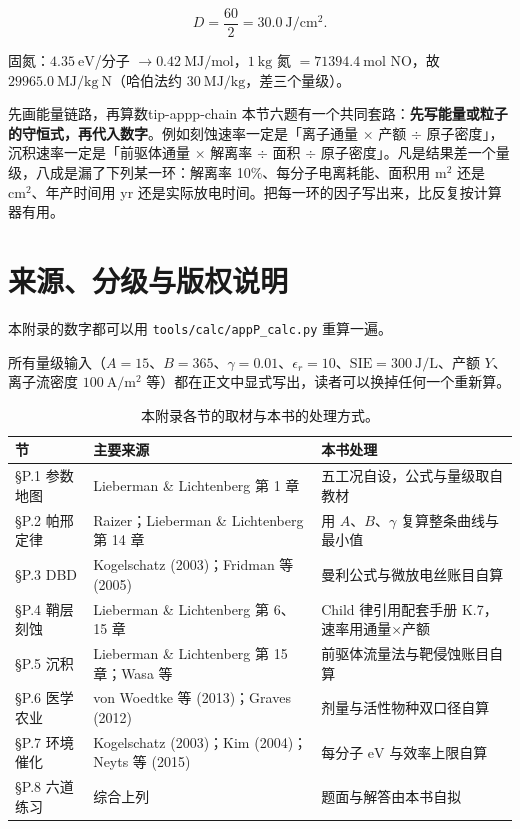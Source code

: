 \begin{equation}
  D = \frac{60}{2} = 30.0\ \mathrm{J/cm^2}.
  \label{eq:app-p-ex6a}
\end{equation}

固氮：$4.35\ \mathrm{eV}$/分子 $\to 0.42\ \mathrm{MJ/mol}$，$1\ \mathrm{kg}$ 氮 $=71394.4\ \mathrm{mol}$ NO，故 $29965.0\ \mathrm{MJ/kg\ N}$（哈伯法约 $30\ \mathrm{MJ/kg}$，差三个量级）。

\begin{tip}{先画能量链路，再算数}{tip-appp-chain}
本节六题有一个共同套路：\textbf{先写能量或粒子的守恒式，再代入数字}。例如刻蚀速率一定是「离子通量 $\times$ 产额 $\div$ 原子密度」，沉积速率一定是「前驱体通量 $\times$ 解离率 $\div$ 面积 $\div$ 原子密度」。凡是结果差一个量级，八成是漏了下列某一环：解离率 10\%、每分子电离耗能、面积用 $\mathrm{m^2}$ 还是 $\mathrm{cm^2}$、年产时间用 yr 还是实际放电时间。把每一环的因子写出来，比反复按计算器有用。
\end{tip}

\section{来源、分级与版权说明}

\begingroup\small
本附录的数字都可以用 \texttt{tools/\allowbreak{}calc/\allowbreak{}appP\_calc.py} 重算一遍。
\label{sec:app-p-source}

所有量级输入（$A=15$、$B=365$、$\gamma=0.01$、$\epsilon_r=10$、$\mathrm{SIE}=300\ \mathrm{J/L}$、产额 $Y$、离子流密度 $100\ \mathrm{A/m^2}$ 等）都在正文中显式写出，读者可以换掉任何一个重新算。

\begin{table}[htbp]
  \centering
  \small
  \caption{本附录各节的取材与本书的处理方式。}
  \label{tab:app-p-source}
  \begin{tabular}{@{}p{3.6cm}p{5.4cm}p{6.4cm}@{}}
    \toprule
    节 & 主要来源 & 本书处理 \\
    \midrule
    §P.1 参数地图 & Lieberman \& Lichtenberg 第 1 章 & 五工况自设，公式与量级取自教材 \\
    §P.2 帕邢定律 & Raizer；Lieberman \& Lichtenberg 第 14 章 & 用 $A$、$B$、$\gamma$ 复算整条曲线与最小值 \\
    §P.3 DBD & Kogelschatz (2003)；Fridman 等 (2005) & 曼利公式与微放电丝账目自算 \\
    §P.4 鞘层刻蚀 & Lieberman \& Lichtenberg 第 6、15 章 & Child 律引用配套手册 K.7，速率用通量$\times$产额 \\
    §P.5 沉积 & Lieberman \& Lichtenberg 第 15 章；Wasa 等 & 前驱体流量法与靶侵蚀账目自算 \\
    §P.6 医学农业 & von Woedtke 等 (2013)；Graves (2012) & 剂量与活性物种双口径自算 \\
    §P.7 环境催化 & Kogelschatz (2003)；Kim (2004)；Neyts 等 (2015) & 每分子 $\mathrm{eV}$ 与效率上限自算 \\
    §P.8 六道练习 & 综合上列 & 题面与解答由本书自拟 \\
    \bottomrule
  \end{tabular}
\end{table}

